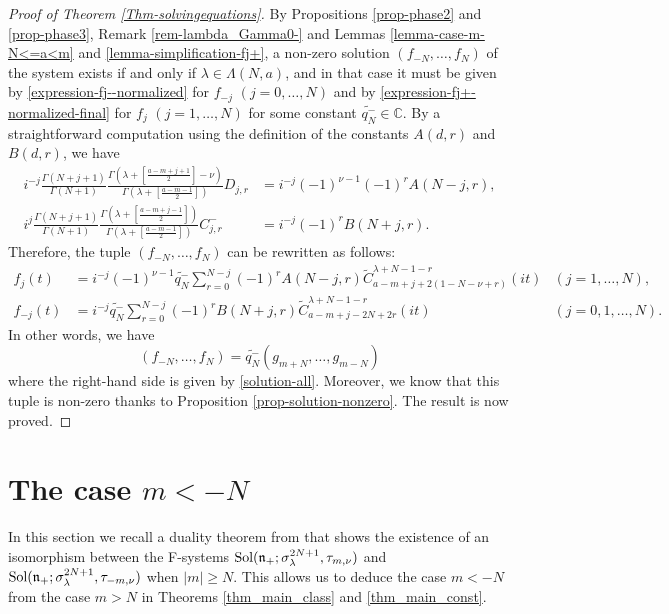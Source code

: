 \documentclass[12pt, pdflatex, a4paper]{article}
\theoremstyle{plain}
\theoremstyle{definition}
\def\C{{\mathbb C}}
\def\Geg{\widetilde{C}}
\def\n{\mathfrak{n}}
\def\Sol{\text{\normalfont{Sol}}}
\begin{document}
\begin{proof}[Proof of Theorem \ref{Thm-solvingequations}]
By Propositions \ref{prop-phase2} and \ref{prop-phase3}, Remark \ref{rem-lambda_Gamma0-} and Lemmas \ref{lemma-case-m-N<=a<m} and \ref{lemma-simplification-fj+}, a non-zero solution $(f_{-N}, \ldots, f_N)$ of the system exists if and only if $\lambda \in \Lambda(N,a)$, and in that case it must be given by \eqref{expression-fj--normalized} for $f_{-j}$ $(j = 0, \ldots, N)$ and by \eqref{expression-fj+-normalized-final} for $f_j$ $(j = 1, \ldots, N)$ for some constant $\widetilde{q_N^-} \in \C$.
By a straightforward computation using the definition of the constants $A(d,r)$ and $B(d,r)$, we have 
\begin{align*}
i^{-j}\frac{\Gamma(N+j+1)}{\Gamma(N+1)}\frac{\Gamma\left(\lambda + \left[\frac{a-m+j+1}{2}\right]-\nu\right)}{\Gamma\left(\lambda + \left[\frac{a-m-1}{2}\right]\right)}D_{j,r} &= i^{-j}(-1)^{\nu-1}(-1)^r A(N-j, r),\\
i^{j}\frac{\Gamma(N+j+1)}{\Gamma(N+1)}\frac{\Gamma\left(\lambda + \left[\frac{a-m+j-1}{2}\right]\right)}{\Gamma\left(\lambda + \left[\frac{a-m-1}{2}\right]\right)}C_{j,r}^- &= i^{-j}(-1)^r B(N+j, r).
\end{align*}
Therefore, the tuple $(f_{-N}, \ldots, f_N)$ can be rewritten as follows:
\begin{align*}
f_j(t) &= i^{-j}(-1)^{\nu-1}\widetilde{q_N^-}\sum_{r=0}^{N-j}(-1)^r A(N-j, r) \Geg_{a-m+j+2(1-N-\nu+r)}^{\lambda+N-1-r}(it) & (j= 1, \ldots, N),\\
f_{-j}(t) &= i^{-j}\widetilde{q_N^-}\sum_{r=0}^{N-j}(-1)^rB(N+j,r)\Geg_{a-m+j-2N+2r}^{\lambda+N-1-r}(it) & (j= 0, 1, \ldots, N).
\end{align*}
In other words, we have
\begin{equation*}
(f_{-N}, \ldots, f_N) = \widetilde{q_N^-}(g_{m+N}, \ldots, g_{m-N})
\end{equation*}
where the right-hand side is given by \eqref{solution-all}. Moreover, we know that this tuple is non-zero thanks to Proposition \ref{prop-solution-nonzero}. The result is now proved.
\end{proof}

\section{The case $m < -N$}\label{section-case_m_lessthan_-N}
In this section we recall a duality theorem from \cite{Per-Val24} that shows the existence of an isomorphism between the F-systems $\Sol(\n_+; \sigma^{2N+1}_\lambda, \tau_{m, \nu})$ and $\Sol(\n_+; \sigma^{2N+1}_\lambda, \tau_{-m, \nu})$ when $|m| \geq N$. This allows us to deduce the case $m < -N$ from the case $m > N$ in Theorems \ref{thm_main_class} and \ref{thm_main_const}.
\end{document}
